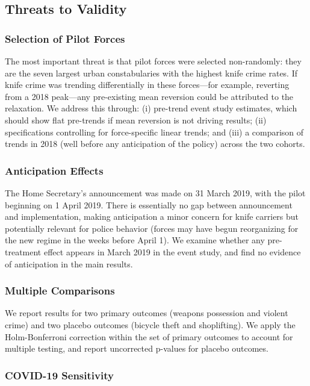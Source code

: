 \documentclass[12pt]{article}
\begin{document}
\subsection{Threats to Validity}

\subsubsection*{Selection of Pilot Forces}

The most important threat is that pilot forces were selected non-randomly: they are the seven largest urban constabularies with the highest knife crime rates. If knife crime was trending differentially in these forces---for example, reverting from a 2018 peak---any pre-existing mean reversion could be attributed to the relaxation. We address this through: (i) pre-trend event study estimates, which should show flat pre-trends if mean reversion is not driving results; (ii) specifications controlling for force-specific linear trends; and (iii) a comparison of trends in 2018 (well before any anticipation of the policy) across the two cohorts.

\subsubsection*{Anticipation Effects}

The Home Secretary's announcement was made on 31 March 2019, with the pilot beginning on 1 April 2019. There is essentially no gap between announcement and implementation, making anticipation a minor concern for knife carriers but potentially relevant for police behavior (forces may have begun reorganizing for the new regime in the weeks before April 1). We examine whether any pre-treatment effect appears in March 2019 in the event study, and find no evidence of anticipation in the main results.

\subsubsection*{Multiple Comparisons}

We report results for two primary outcomes (weapons possession and violent crime) and two placebo outcomes (bicycle theft and shoplifting). We apply the Holm-Bonferroni correction within the set of primary outcomes to account for multiple testing, and report uncorrected p-values for placebo outcomes.

\subsubsection*{COVID-19 Sensitivity}
\end{document}
